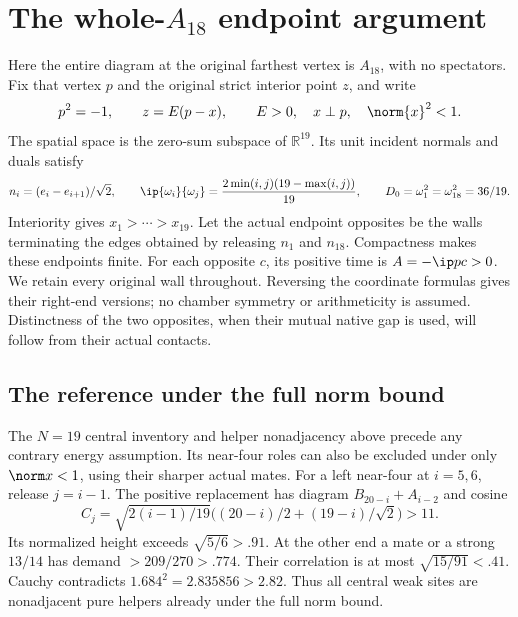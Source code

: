 
\section{The whole-\(A_{18}\) endpoint argument}
\label{app:wholeA18}
Here the entire diagram at the original farthest vertex is
\(A_{18}\), with no spectators. Fix that vertex \(p\) and the
original strict interior point \(z\), and write
\[
 p^2=-1,\qquad z=E(p-x),\qquad E>0,\quad x\perp p,
 \quad \norm{x}^2<1.
\]
The spatial space is the zero-sum subspace of \(\mathbb R^{19}\).
Its unit incident normals and duals satisfy
\[
 n_i=(e_i-e_{i+1})/\sqrt2,\qquad
 \ip{\omega_i}{\omega_j}
   =\frac{2\min(i,j)(19-\max(i,j))}{19},\qquad
 D_0=\omega_1^2=\omega_{18}^2=36/19.
\]
Interiority gives \(x_1>\cdots>x_{19}\).
Let the actual endpoint opposites be the walls terminating the
edges obtained by releasing \(n_1\) and \(n_{18}\).
Compactness makes these endpoints finite. For each opposite \(c\),
its positive time is \(A=-\ip p c>0\).
We retain every original wall throughout. Reversing the coordinate
formulas gives their right-end versions; no chamber symmetry or
arithmeticity is assumed. Distinctness of the two opposites, when
their mutual native gap is used, will follow from their actual contacts.

\subsection{The reference under the full norm bound}
The \(N=19\) central inventory and helper nonadjacency
above precede any contrary energy assumption.
Its near-four roles can also be excluded under
only \(\norm x<1\), using their sharper actual mates.
For a left near-four at \(i=5,6\), release \(j=i-1\).
The positive replacement has diagram
\(B_{20-i}+A_{i-2}\) and cosine
\[
 C_j=\sqrt{2(i-1)/19}
     \bigl((20-i)/2+(19-i)/\sqrt2\bigr)>11.
\]
Its normalized height exceeds \(\sqrt{5/6}>.91\).
At the other end a mate or a strong \(13/14\)
has demand \(>209/270>.774\).
Their correlation is at most
\(\sqrt{15/91}<.41\).
Cauchy contradicts \(1.684^2=2.835856>2.82\).
Thus all central weak sites are nonadjacent pure
helpers already under the full norm bound.


